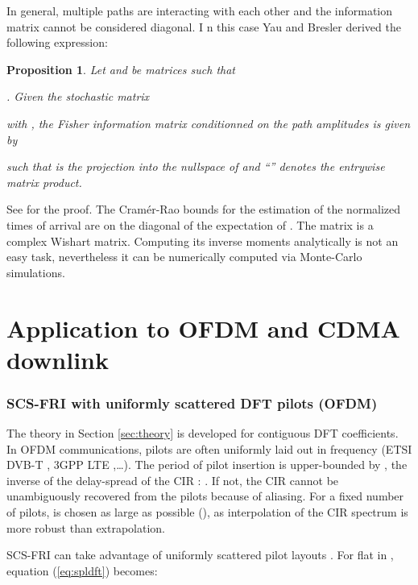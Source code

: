 \documentclass[journal,10pt]{IEEEtran}
\newtheorem{proposition}{Proposition}
\begin{document}
In general,  multiple paths are interacting with each other and the information matrix cannot be considered diagonal. I	n this case Yau and Bresler \cite{Yau1992} derived the following expression:
\begin{proposition}\cite{Yau1992}\label{prop:nsep}
Let  and  be  matrices such that

. Given the stochastic matrix

with ,
the Fisher information matrix  conditionned on the path amplitudes is given by

such that  is the projection into the nullspace of  and ``'' denotes the entrywise matrix product.
\end{proposition}

See \cite{Yau1992} for the proof. The Cram\'er-Rao bounds  for the estimation of the normalized times of arrival are on the diagonal of the expectation of .
The matrix  is a complex Wishart matrix. Computing its inverse moments analytically is not an easy task, nevertheless it can be numerically computed via Monte-Carlo simulations.
 

\section{Application to OFDM and CDMA downlink}\label{sec:ofdm}
\subsubsection{SCS-FRI with uniformly scattered DFT pilots (OFDM)}
The theory in Section \ref{sec:theory} is developed for contiguous DFT coefficients. In OFDM communications, pilots are often uniformly laid out in frequency (ETSI DVB-T \cite{ETSI2001}, 3GPP LTE \cite{Dahlman2008},\dots). The period of pilot insertion  is upper-bounded by , the inverse of the delay-spread of the CIR : .
If  not, the CIR cannot be unambiguously recovered from the pilots because of aliasing. For a fixed number of pilots,  is chosen as large as possible (), as interpolation of the CIR spectrum is more robust than extrapolation.

SCS-FRI can take advantage of uniformly scattered pilot layouts \cite{Maravic2004,Barbotin2010}. For  flat in , equation (\ref{eq:spldft}) becomes:
\end{document}
